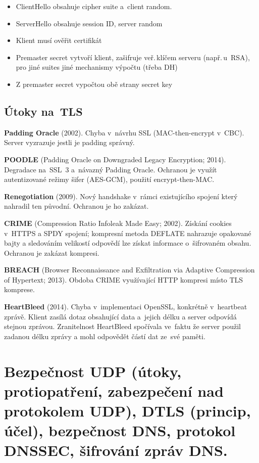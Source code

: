\begin{itemize}
    \item ClientHello obsahuje cipher suite a~client random.
    \item ServerHello obsahuje session ID, server random
    \item Klient musí ověřit certifikát
    \item Premaster secret vytvoří klient, zašifruje veř.\,klíčem serveru (např.\,u~RSA), pro jiné suites jiné mechanismy výpočtu (třeba DH)
    \item Z premaster secret vypočtou obě strany secret key
\end{itemize}





\subsection{Útoky na~TLS}

\textbf{Padding Oracle} (2002).
Chyba v~návrhu SSL (MAC-then-encrypt v~CBC).
Server vyzrazuje jestli je padding správný.

\textbf{POODLE} (Padding Oracle on Downgraded Legacy Encryption; 2014).
Degradace na~SSL~3 a~návazný Padding Oracle.
Ochranou je využít autentizované režimy šifer (AES-GCM), použití encrypt-then-MAC.

\textbf{Renegotiation} (2009).
Nový handshake v~rámci existujícího spojení který nahradil ten původní.
Ochranou je ho zakázat.

\textbf{CRIME} (Compression Ratio Infoleak Made Easy; 2002).
Získání cookies v~HTTPS a SPDY spojení; kompresní metoda DEFLATE nahrazuje opakované bajty a sledováním velikostí odpovědí lze získat informace o~šifrovaném obsahu.
Ochranou je zakázat kompresi.

\textbf{BREACH} (Browser Reconnaissance and Exfiltration via Adaptive Compression of Hypertext; 2013).
Obdoba CRIME využívající HTTP kompresi místo TLS komprese.

\textbf{HeartBleed} (2014).
Chyba v~implementaci OpenSSL, konkrétně v~heartbeat zprávě.
Klient zasílá dotaz obsahující data a~jejich délku a server odpovídá stejnou zprávou.
Zranitelnost HeartBleed spočívala ve~faktu že server použil zadanou délku zprávy a mohl odpovědět částí dat ze~své paměti.


\clearpage
\section{Bezpečnost UDP (útoky, protiopatření, zabezpečení nad protokolem UDP), DTLS (princip, účel), bezpečnost DNS, protokol DNSSEC, šifrování zpráv DNS.}

